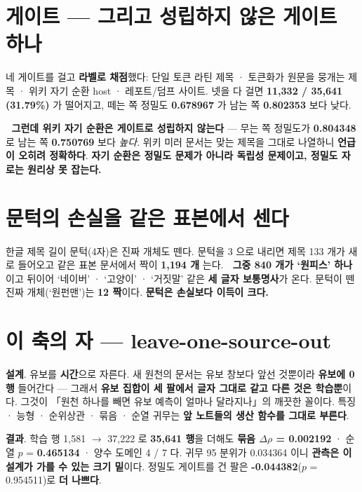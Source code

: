 \documentclass[10pt]{article}
\begin{document}
\section{게이트 --- 그리고 성립하지 않은 게이트 하나}

네 게이트를 걸고 \textbf{라벨로 채점}했다: 단일 토큰 라틴 제목 · 토큰화가 원문을 뭉개는 제목 ·
위키 자기 순환 host · 레포트/덤프 사이트. 넷을 다 걸면 \textbf{11,332 / 35,641 (31.79\%)}
가 떨어지고, 떼는 쪽 정밀도 \textbf{0.678967} 가 남는 쪽 \textbf{0.802353} 보다 낮다.

🔴 \textbf{그런데 위키 자기 순환은 게이트로 성립하지 않는다} --- 무는 쪽 정밀도가
\textbf{0.804348} 로 남는 쪽 \textbf{0.750769} 보다 \emph{높다}. 위키 미러 문서는 맞는 제목을
그대로 나열하니 \textbf{언급이 오히려 정확하다}. \textbf{자기 순환은 정밀도 문제가 아니라 독립성
문제이고, 정밀도 자로는 원리상 못 잡는다.}


\section{문턱의 손실을 같은 표본에서 센다}

한글 제목 길이 문턱(4자)은 진짜 개체도 뗀다. 문턱을 3 으로 내리면 제목 133 개가 새로
들어오고 같은 표본 문서에서 짝이 \textbf{1,194 개} 는다. 🔴 \textbf{그중 840 개가
`원피스' 하나}이고 뒤이어 `네이버' · `고양이' · `거짓말' 같은 \textbf{세 글자 보통명사}가 온다.
문턱이 뗀 진짜 개체(`원펀맨')는 \textbf{12 짝}이다. \textbf{문턱은 손실보다 이득이 크다.}

\section{이 축의 자 --- leave-one-source-out}

\textbf{설계}. 유보를 \textbf{시간}으로 자른다. 새 원천의 문서는 유보 창보다 앞선 것뿐이라
\textbf{유보에 0 행} 들어간다 --- 그래서 \textbf{유보 집합이 세 팔에서 글자 그대로 같고
다른 것은 학습뿐}이다. 그것이 「원천 하나를 빼면 유보 예측이 얼마나 달라지나」의 깨끗한 꼴이다.
특징 · 능형 · 순위상관 · 묶음 · 순열 귀무는 \textbf{앞 노트들의 생산 함수를 그대로 부른다}.

\textbf{결과}. 학습 행 1,581 $\to$ 37,222 로 \textbf{35,641 행}을 더해도
\textbf{묶음 $\Delta\rho$ = 0.002192} · 순열 $p$ = \textbf{0.465134} · 양수 도메인 4 / 7 다.
귀무 95 분위가 0.034364 이니 \textbf{관측은 이 설계가 가를 수 있는 크기 밑}이다.
정밀도 게이트를 건 팔은 \textbf{-0.044382}($p$ = 0.954511)로 \textbf{더 나쁘다}.
\end{document}
